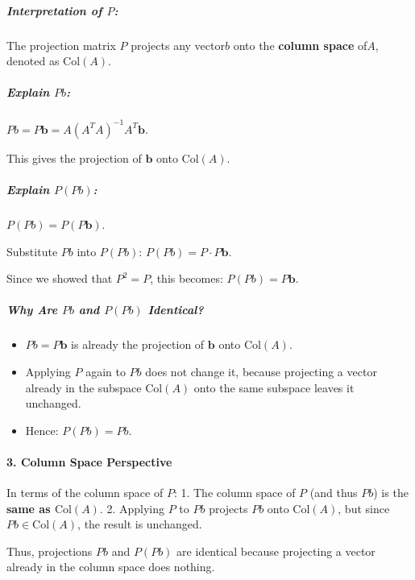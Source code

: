 \documentclass[11pt]{article}
\providecommand{\tightlist}{%
      \setlength{\itemsep}{0pt}\setlength{\parskip}{0pt}}
\begin{document}
\subparagraph{\texorpdfstring{\textbf{Interpretation of
\(P\):}}{Interpretation of P:}}\label{interpretation-of-p}

The projection matrix \(P\) projects any vector\(b\) onto the
\textbf{column space} of\(A\), denoted as \(\text{Col}(A)\).

\subparagraph{\texorpdfstring{\textbf{Explain
\(Pb\):}}{Explain Pb:}}\label{explain-pb}

\(Pb = P \mathbf{b} = A (A^T A)^{-1} A^T \mathbf{b}.\)

This gives the projection of \(\mathbf{b}\) onto \(\text{Col}(A)\).

\subparagraph{\texorpdfstring{\textbf{Explain
\(P(Pb)\):}}{Explain P(Pb):}}\label{explain-ppb}

\(P(Pb) = P(P \mathbf{b}).\)

Substitute \(Pb\) into \(P(Pb)\): \(P(Pb) = P \cdot P \mathbf{b}.\)

Since we showed that \(P^2 = P\), this becomes:
\(P(Pb) = P \mathbf{b}.\)

\subparagraph{\texorpdfstring{\textbf{Why Are \(Pb\) and \(P(Pb)\)
Identical?}}{Why Are Pb and P(Pb) Identical?}}\label{why-are-pb-and-ppb-identical}

\begin{itemize}
\tightlist
\item
  \(Pb = P \mathbf{b}\) is already the projection of \(\mathbf{b}\) onto
  \(\text{Col}(A)\).
\item
  Applying \(P\) again to \(Pb\) does not change it, because projecting
  a vector already in the subspace \(\text{Col}(A)\) onto the same
  subspace leaves it unchanged.
\item
  Hence: \(P(Pb) = Pb.\)
\end{itemize}

\paragraph{\texorpdfstring{\textbf{3. Column Space
Perspective}}{3. Column Space Perspective}}\label{column-space-perspective}

In terms of the column space of \(P\): 1. The column space of \(P\) (and
thus \(Pb\)) is the \textbf{same as \(\text{Col}(A)\)}. 2. Applying
\(P\) to \(Pb\) projects \(Pb\) onto \(\text{Col}(A)\), but since
\(Pb \in \text{Col}(A)\), the result is unchanged.

Thus, projections \(Pb\) and \(P(Pb)\) are identical because projecting
a vector already in the column space does nothing.
\end{document}

